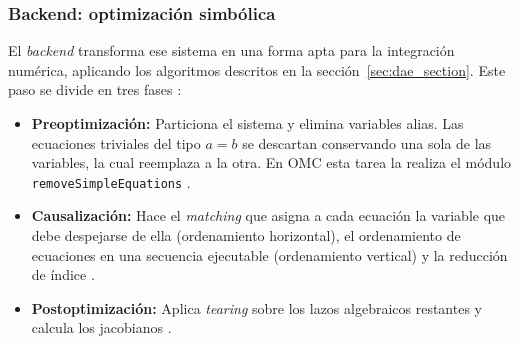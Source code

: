 \subsubsection{Backend: optimización simbólica} 
El \textit{backend} transforma ese sistema en una forma apta para la integración numérica, aplicando los algoritmos descritos en la sección~\ref{sec:dae_section}. Este paso se divide en tres fases \cite{om_compiler}:
\begin{itemize}
	
	
	\item \textbf{Preoptimización:} Particiona el sistema y elimina variables alias. Las ecuaciones triviales del tipo $a = b$ se descartan conservando una sola de las variables, la cual reemplaza a la otra. En OMC esta tarea la realiza el módulo \texttt{removeSimpleEquations} \cite{om_flags}.
	
	\item \textbf{Causalización:} Hace el \textit{matching} que asigna a cada ecuación la variable que debe despejarse de ella (ordenamiento horizontal), el ordenamiento de ecuaciones en una secuencia ejecutable (ordenamiento vertical) y la reducción de índice \cite{om_compiler}.
	
	\item \textbf{Postoptimización:} Aplica \textit{tearing} sobre los lazos algebraicos restantes y calcula los jacobianos \cite{om_compiler}.
	
\end{itemize}

